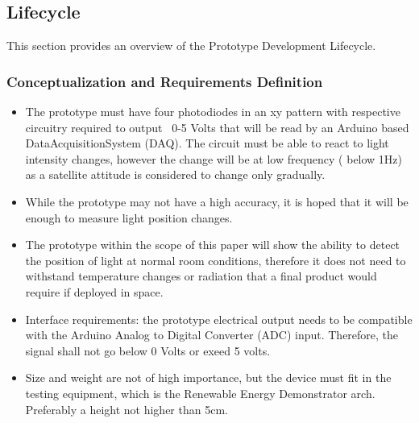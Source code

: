 \subsection{Lifecycle}
This section provides an overview of the Prototype Development Lifecycle.

%         

\subsubsection*{Conceptualization and Requirements Definition}
\begin{itemize}
  \item The prototype must have four photodiodes in an xy pattern with respective circuitry required to output ~0-5 Volts that will be read by an Arduino based DataAcquisitionSystem (DAQ). The circuit must be able to react to light intensity changes, however the change will be at low frequency ( below 1Hz) as a satellite attitude is considered to change only gradually.
  \item While the prototype may not have a high accuracy, it is hoped that it will be enough to measure light position changes.  
  \item The prototype within the scope of this paper will show the ability to detect the position of light at normal room conditions, therefore it does not need to withstand temperature changes or radiation that a final product would require if deployed in space.
  \item Interface requirements: the prototype electrical output needs to be compatible with the Arduino Analog to Digital Converter (ADC) input. Therefore, the signal shall not go below 0 Volts or exeed 5 volts. 
  \item Size and weight are not of high importance, but the device must fit in the testing equipment, which is the Renewable Energy Demonstrator arch. Preferably a height not higher than 5cm.
\end{itemize}
